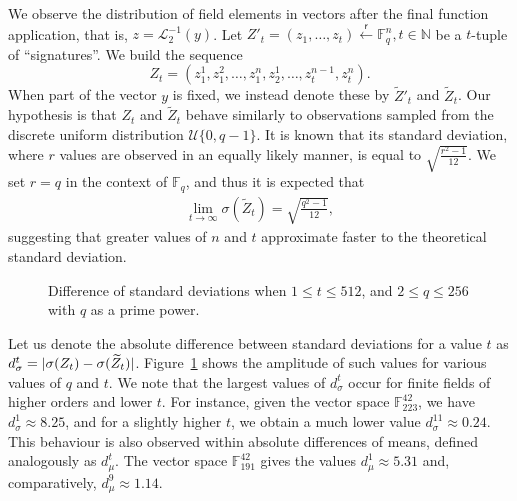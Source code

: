 \documentclass[draft, 12pt, a4paper, oneside]{memoir}
\DeclarePairedDelimiter\abs{\lvert}{\rvert}
\newcommand{\random}{\overset{\mathsf{r}}{\gets}}
\theoremstyle{definition}
\begin{document}
We observe the distribution of field elements in vectors after the final
function application, that is, $z = \mathcal{L}_{2}^{-1}(y)$. Let
$Z'_{t} = (z_{1}, \dots, z_{t}) \random \mathbb{F}_{q}^{n}, t \in \mathbb{N}$ be
a $t$-tuple of ``signatures''. We build the sequence $$Z_{t} = (z_{1}^{1},
z_{1}^{2}, \dots, z_{1}^{n}, z_{2}^{1}, \dots, z_{t}^{n - 1}, z_{t}^{n}).$$
When part of the vector $y$ is fixed, we instead denote these by
$\widetilde{Z}'_{t}$ and $\widetilde{Z}_{t}$. Our hypothesis is that $Z_{t}$
and $\widetilde{Z}_{t}$ behave similarly to observations sampled from the
discrete uniform distribution $\mathcal{U}\{0, q - 1\}$. It is known that its
standard deviation, where $r$ values are observed in an equally likely manner,
is equal to $\sqrt{\frac{r^{2} - 1}{12}}$. We set $r = q$ in the context of $\mathbb{F}_{q}$, and thus it is expected that
\begin{align}
  \lim_{t \to \infty} \sigma(\widetilde{Z}_{t}) = \sqrt{\frac{q^{2} - 1}{12}},
\end{align}
suggesting that greater values of $n$ and $t$ approximate faster to the
theoretical standard deviation.

\begin{figure}[ht]
  \subfloat[
    $d_{\sigma}^{t}$ for $n = 42, v_{1} = 17$.\label{fig:2a}
  ]{
  }
  \subfloat[
    $d_{\sigma}^{t}$ for $n = 90, v_{1} = 35$.\label{fig:2b}
  ]{
  }
  \caption{Difference of standard deviations when $1 \leq t \leq 512$,
    and $2 \leq q \leq 256$ with $q$ as a prime power.}\label{fig:2}
\end{figure}

Let us denote the absolute difference between standard deviations for a value
$t$ as $d_{\sigma}^{t} = \abs{\sigma(Z_{t}) - \sigma(\widetilde{Z}_{t})}$.
Figure~\ref{fig:2} shows the amplitude of such values for various values of $q$
and $t$. We note that the largest values of $d_{\sigma}^{t}$ occur for finite
fields of higher orders and lower $t$. For instance, given the vector space
$\mathbb{F}_{223}^{42}$, we have $d_{\sigma}^{1} \approx 8.25$, and for a
slightly higher $t$, we obtain a much lower value
$d_{\sigma}^{11} \approx 0.24$. This behaviour is also observed within absolute
differences of means, defined analogously as $d_{\mu}^{t}$. The vector space
$\mathbb{F}_{191}^{42}$ gives the values $d_{\mu}^{1} \approx 5.31$ and,
comparatively, $d_{\mu}^{9} \approx 1.14$.
\end{document}
